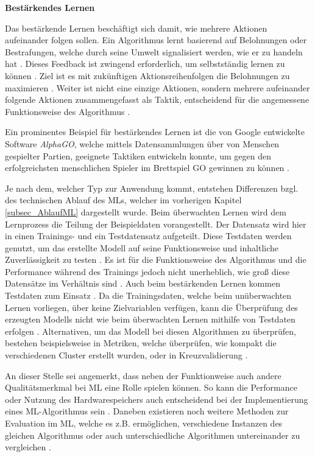 \textbf{Bestärkendes Lernen}
\begin{addmargin}[25pt]{0pt}
Das bestärkende Lernen beschäftigt sich damit, wie mehrere Aktionen aufeinander folgen sollen. Ein Algorithmus lernt basierend auf Belohnungen oder Bestrafungen, welche durch seine Umwelt signalisiert werden, wie er zu handeln hat \cite{Lorenz.2020}. Dieses Feedback ist zwingend erforderlich, um selbstständig lernen zu können \cite{Wuttke.2022}. Ziel ist es mit  zukünftigen Aktionsreihenfolgen die Belohnungen zu maximieren \cite{Lorenz.2020}. Weiter ist nicht eine einzige Aktionen, sondern mehrere aufeinander folgende Aktionen zusammengefasst als Taktik, entscheidend für die angemessene Funktionsweise des Algorithmus \cite{Alpaydin+2019}. 

Ein prominentes Beispiel für bestärkendes Lernen ist die von Google entwickelte Software \textit{AlphaGO}, welche mittels Datensammlungen über von Menschen gespielter Partien, geeignete Taktiken entwickeln konnte, um gegen den erfolgreichsten menschlichen Spieler im  Brettspiel GO gewinnen zu können \cite{Wuttke.2022}.
\end{addmargin}

Je nach dem, welcher Typ zur Anwendung kommt, entstehen Differenzen bzgl. des technischen Ablauf des MLs, welcher im vorherigen Kapitel \ref{subsec_AblaufML} dargestellt wurde. Beim überwachten Lernen wird dem Lernprozess die Teilung der Beispieldaten vorangestellt. Der Datensatz wird hier in einen Trainings- und ein Testdatensatz aufgeteilt. Diese Testdaten werden genutzt, um das erstellte Modell auf seine Funktionsweise und inhaltliche Zuverlässigkeit zu testen \cite{kotsiantis2007supervised}. Es ist für die Funktionsweise des Algorithmus und die Performance während des Trainings jedoch nicht unerheblich, wie groß diese Datensätze im Verhältnis sind \cite{nguyen2021influence}. Auch beim bestärkenden Lernen kommen Testdaten zum Einsatz \cite{Lorenz.2020}. Da die Trainingsdaten, welche beim unüberwachten Lernen vorliegen, über keine Zielvariablen verfügen, kann die Überprüfung des erzeugten Modells nicht wie beim überwachten Lernen mithilfe von Testdaten erfolgen \cite{ayodele}. Alternativen, um das Modell bei diesen Algorithmen zu überprüfen, bestehen beispielsweise in Metriken, welche überprüfen, wie kompakt die verschiedenen Cluster erstellt wurden, oder in Kreuzvalidierung \cite{halkidi2001clustering, perry2009cross}.  

An dieser Stelle sei angemerkt, dass neben der Funktionweise auch andere Qualitätsmerkmal bei ML eine Rolle spielen können. So kann die Performance oder Nutzung des Hardwarespeichers auch entscheidend bei der Implementierung eines ML-Algorithmus sein \cite{coleman2019analysis}. Daneben existieren noch weitere Methoden zur Evaluation im ML, welche es z.B. ermöglichen, verschiedene Instanzen des gleichen Algorithmus oder auch unterschiedliche Algorithmen untereinander zu vergleichen \cite{raschka2018model}.